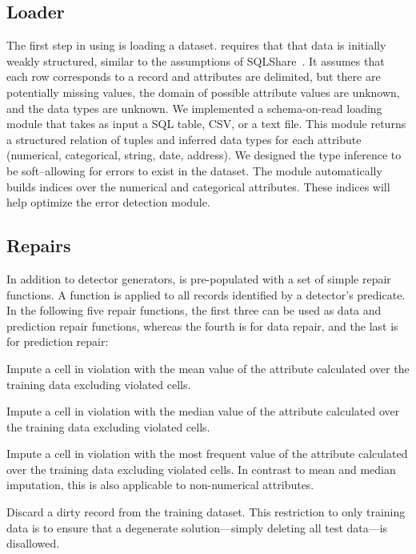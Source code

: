     \subsection{Loader}
    The first step in using \sys is loading a dataset. \sys requires that that data is initially weakly structured, similar to the assumptions of SQLShare~\cite{howe2013sqlshare}. It assumes that each row corresponds to a record and attributes are delimited, but there are potentially missing values, the domain of possible attribute values are unknown, and the data types are unknown.
    We implemented a schema-on-read loading module that takes as input a SQL table, CSV, or a text file.
    This module returns a structured relation of tuples and inferred data types for each attribute (numerical, categorical, string, date, address).
    We designed the type inference to be soft--allowing for errors to exist in the dataset.
    The module automatically builds indices over the numerical and categorical attributes.
    These indices will help optimize the error detection module.
\fi



\subsection{Repairs}
In addition to detector generators, \sys is pre-populated with a set of simple repair functions.  A function is applied to all records identified by a detector's predicate.  In the following five repair functions, the first three can be used as data and prediction repair functions,  whereas the fourth is for data repair, and the last is for prediction repair:

 Impute a cell in violation with the mean value of the attribute calculated over the training data excluding violated cells.


 Impute a cell in violation with the median value of the attribute calculated over the training data excluding violated cells.

 Impute a cell in violation with the most frequent value of the attribute calculated over the training data excluding violated cells.  In contrast to mean and median imputation, this is also applicable to non-numerical attributes.

 Discard a dirty record from the training dataset.  This restriction to only training data is to ensure that a degenerate solution---simply deleting all test data---is disallowed. 

